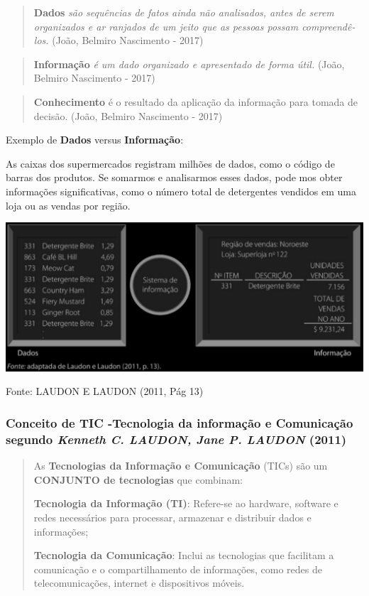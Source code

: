\documentclass[
]{book}
\begin{document}
\begin{quote}
\textbf{Dados} \emph{são sequências de fatos ainda não analisados, antes de serem organizados e ar­ ranjados de um jeito que as pessoas possam compreendê-los.} (João, Belmiro Nascimento - 2017)
\end{quote}

\begin{quote}
\textbf{Informação} \emph{é um dado organizado e apresentado de forma útil.} (João, Belmiro Nascimento - 2017)
\end{quote}

\begin{quote}
\textbf{Conhecimento} é o resultado da aplicação da informação para tomada de decisão. (João, Belmiro Nascimento - 2017)
\end{quote}

Exemplo de \textbf{Dados} versus \textbf{Informação}:

As caixas dos supermercados registram milhões de dados, como o código de barras dos produtos. Se somarmos e analisarmos esses dados, pode­ mos obter informações significativas, como o número total de detergentes vendidos em uma loja ou as vendas por região.

\includegraphics{images/1-dados-info/Dados-Info.jpg}

Fonte: LAUDON E LAUDON (2011, Pág 13)

\subsubsection{\texorpdfstring{Conceito de TIC -Tecnologia da informação e Comunicação \textbf{segundo} \emph{Kenneth C. LAUDON, Jane P. LAUDON} (2011)}{Conceito de TIC -Tecnologia da informação e Comunicação segundo Kenneth C. LAUDON, Jane P. LAUDON (2011)}}\label{conceito-de-tic--tecnologia-da-informauxe7uxe3o-e-comunicauxe7uxe3o-segundo-kenneth-c.-laudon-jane-p.-laudon-2011}

\begin{quote}
As \textbf{Tecnologias da Informação e Comunicação} (TICs) são um \textbf{CONJUNTO de tecnologias} que combinam:

\textbf{Tecnologia da Informação (TI)}: Refere-se ao hardware, software e redes necessários para processar, armazenar e distribuir dados e informações;

\textbf{Tecnologia da Comunicação}: Inclui as tecnologias que facilitam a comunicação e o compartilhamento de informações, como redes de telecomunicações, internet e dispositivos móveis.
\end{quote}
\end{document}
